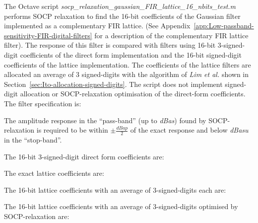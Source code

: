 \documentclass[a4paper,twoside,10pt,english]{report}
\begin{document}
The Octave script
\emph{socp\_relaxation\_gaussian\_FIR\_lattice\_16\_nbits\_test.m} performs
SOCP relaxation to find the 16-bit coefficients of the Gaussian filter
implemented as a complementary FIR lattice. (See
Appendix~\ref{app:Low-passband-sensitivity-FIR-digital-filters} for a
description of the complementary FIR lattice filter). The response of this
filter is compared with filters using 16-bit 3-signed-digit coefficients of
the direct form implementation and the 16-bit signed-digit coefficients of the
lattice implementation. The coefficients of the lattice filters are allocated
an average of 3 signed-digits with the algorithm of \emph{Lim et al.} shown in
Section~\ref{sec:Ito-allocation-signed-digits}.  The script does not implement
signed-digit allocation or SOCP-relaxation optimisation of the direct-form
coefficients. The filter specification is:
\begin{small}

\end{small}
The amplitude response in the ``pass-band'' (up to \emph{dBas}) found by
SOCP-relaxation is required to be within \emph{$\pm{}\frac{dBap}{2}$} of the
exact response and below \emph{dBasu} in the ``stop-band''.

The 16-bit 3-signed-digit direct form coefficients are:
\begin{small}

\end{small}
The exact lattice coefficients are:
\begin{small}


\end{small}
The 16-bit lattice coefficients with an average of 3-signed-digits each are:
\begin{small}


\end{small}
The 16-bit lattice coefficients with an average of 3-signed-digits optimised
by SOCP-relaxation are:
\begin{small}


\end{small}
\end{document}
